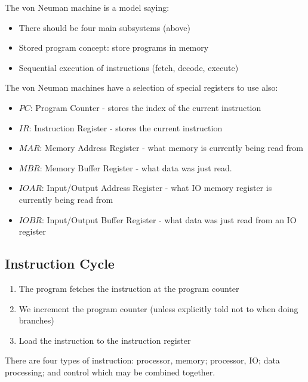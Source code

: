 The von Neuman machine is a model saying:
\begin{itemize}
	\item There should be four main subsystems (above)
	\item Stored program concept: store programs in memory
	\item Sequential execution of instructions (fetch, decode, execute)
\end{itemize}
%
The von Neuman machines have a selection of special registers to use also:
\begin{itemize}
	\item \(PC\): Program Counter - stores the index of the current instruction
	\item \(IR\): Instruction Register - stores the current instruction
	\item \(MAR\): Memory Address Register - what memory is currently being read from
	\item \(MBR\): Memory Buffer Register - what data was just read.
	\item \(IO AR\): Input/Output Address Register - what IO memory register is currently being read from
	\item \(IO BR\): Input/Output Buffer Register - what data was just read from an IO register
\end{itemize}

\subsection{Instruction Cycle}\label{sub:instruction_cycle}

\begin{center}
\end{center}
\begin{enumerate}
	\item The program fetches the instruction at the program counter
	\item We increment the program counter (unless explicitly told not to when doing branches)
	\item Load the instruction to the instruction register
\end{enumerate}
%
There are four types of instruction: processor, memory; processor, IO; data processing; and control which may be combined together.
